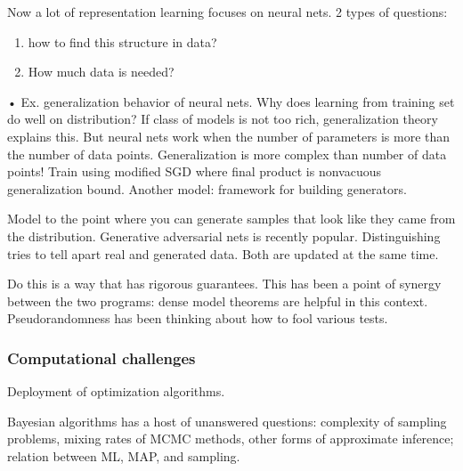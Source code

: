 Now a lot of representation learning focuses on neural nets. 2 types of questions:
\begin{enumerate}
\item
how to find this structure in data?
\item
How much data is needed?
\end{enumerate}•
Ex. generalization behavior of neural nets. Why does learning from training set do well on distribution? If class of models is not too rich, generalization theory explains this. But neural nets work when the number of parameters is more than the number of data points. 
Generalization is more complex than number of data points!
Train using modified SGD where final product is nonvacuous generalization bound. Another model: framework for building generators. 

Model to the point where you can generate samples that look like they came from the distribution. Generative adversarial nets is recently popular. Distinguishing tries to tell apart real and generated data. Both are updated at the same time.

Do this is a way that has rigorous guarantees. This has been a point of synergy between the two programs: dense model theorems are helpful in this context. Pseudorandomness has been thinking about how to fool various tests.

\subsubsection{Computational challenges}

Deployment of optimization algorithms.

Bayesian algorithms has a host of unanswered questions: complexity of sampling problems, mixing rates of MCMC methods, other forms of approximate inference; relation between ML, MAP, and sampling.

